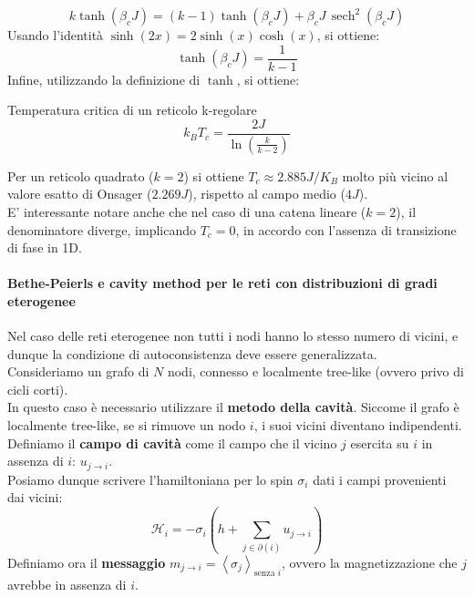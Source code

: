 \begin{equation}
    k \tanh(\beta_c J)=(k-1) \tanh (\beta_c J)+ \beta_c J\,\operatorname{sech}^{2} (\beta_c J) 
\end{equation}
Usando l'identità $\sinh(2x)=2 \sinh(x) \cosh(x)$, si ottiene:
\begin{equation}
\tanh(\beta_c J)=\frac{1}{k-1}
\end{equation}
Infine, utilizzando la definizione di $\tanh$, si ottiene:
\begin{boxl}{Temperatura critica di un reticolo k-regolare}
\begin{equation}
    k_B T_c=\frac{2J}{\ln(\frac{k}{k-2})}
\end{equation}
\end{boxl}
Per un reticolo quadrato ($k=2$) si ottiene $T_c \approx 2.885 J/K_B$ molto più vicino al valore esatto di Onsager ($2.269 J$), rispetto al campo medio ($4 J$).\\

E' interessante notare anche che nel caso di una catena lineare ($k=2$), il denominatore diverge, implicando $T_c=0$, in accordo con l'assenza di transizione di fase in 1D.

\paragraph{Bethe-Peierls e cavity method per le reti con distribuzioni di gradi eterogenee}
Nel caso delle reti eterogenee non tutti i nodi hanno lo stesso numero di vicini, e dunque la condizione di autoconsistenza deve essere generalizzata.\\
Consideriamo un grafo di $N$ nodi, connesso e localmente tree-like (ovvero privo di cicli corti).\\

In questo caso è necessario utilizzare il \textbf{metodo della cavità}. Siccome il grafo è localmente tree-like, se si rimuove un nodo $i$, i suoi vicini diventano indipendenti. \\
Definiamo il \textbf{campo di cavità} come il campo che il vicino $j$ esercita su $i$ in assenza di $i$: $u_{j \to i}$.\\
Posiamo dunque scrivere l'hamiltoniana per lo spin $\sigma_i$ dati i campi provenienti dai vicini:
\begin{equation}
    \mathcal{H}_i=-\sigma_i (h+ \sum_{j \in \partial (i)}^{}u_{j \to i})
\end{equation}
Definiamo ora il \textbf{messaggio} $m_{j \to i}= \left\langle \sigma_j\right\rangle_{\text{senza } i}$, ovvero la magnetizzazione che $j$ avrebbe in assenza di $i$.\\

